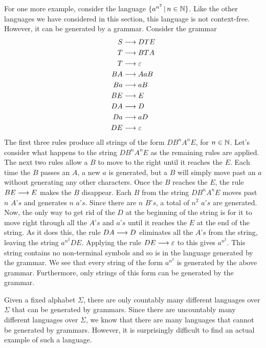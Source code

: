 \medbreak

For one more example, consider the language $\{a^{n^2}\,|\, n\in{\mathbb N}\}$.  Like the other
languages we have considered in this section, this language is not context-free.
However, it can be generated by a grammar.  Consider the grammar
\begin{align*}
  S&\longrightarrow DTE\\
  T&\longrightarrow BTA\\
  T&\longrightarrow \varepsilon\\
  BA&\longrightarrow AaB\\
  Ba&\longrightarrow aB\\
  BE&\longrightarrow E\\
  DA&\longrightarrow D\\
  Da&\longrightarrow aD\\
  DE&\longrightarrow \varepsilon
\end{align*}
The first three rules produce all strings of the form $DB^nA^nE$, for $n\in{\mathbb N}$.
Let's consider what happens to the string $DB^nA^nE$ as the remaining rules are applied.
The next two rules allow a $B$ to move to the right until it reaches the $E$.
Each time the $B$ passes an $A$, a new $a$ is generated, but a $B$ will simply
move past an $a$ without generating any other characters.  Once the $B$ reaches
the $E$, the rule $BE\longrightarrow E$ makes the $B$ disappear.  Each $B$ from the
string $DB^nA^nE$ moves past $n$ $A\text{'}s$ and generates $n$ $a\text{'}s$.
Since there are $n$ $B\text{'}s$, a total of $n^2$ $a\text{'}s$ are generated.
Now, the only way to get rid of the $D$ at the beginning of the string is for
it to move right through all the $A\text{'}s$ and $a\text{'}s$ until it reaches
the $E$ at the end of the string.  As it does this, the rule $DA\longrightarrow D$
eliminates all the $A\text{'}s$ from the string, leaving the string $a^{n^2}DE$.
Applying the rule $DE\longrightarrow\varepsilon$ to this gives $a^{n^2}$.  This
string contains no non-terminal symbols and so is in the language generated
by the grammar.  We see that every string of the form $a^{n^2}$ is generated
by the above grammar.  Furthermore, only strings of this form can be generated
by the grammar.  

\medbreak

Given a fixed alphabet $\Sigma$, there are only countably many different
languages over $\Sigma$ that can be generated by grammars.  Since there
are uncountably many different languages over $\Sigma$, we know that
there are many languages that cannot be generated by grammars.
However, it is surprisingly difficult to find an actual example of
such a language.

